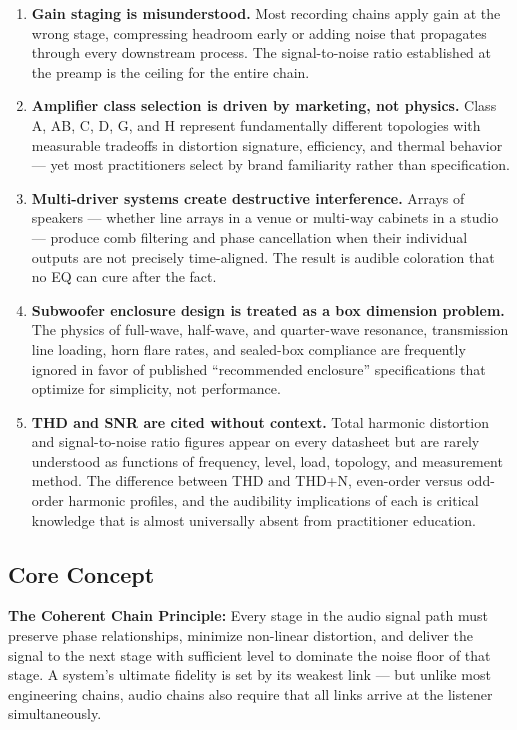 \documentclass[11pt,letterpaper]{article}
\begin{document}
\begin{enumerate}
  \item \textbf{Gain staging is misunderstood.} Most recording chains apply gain at the wrong stage, compressing headroom early or adding noise that propagates through every downstream process. The signal-to-noise ratio established at the preamp is the ceiling for the entire chain.
  \item \textbf{Amplifier class selection is driven by marketing, not physics.} Class A, AB, C, D, G, and H represent fundamentally different topologies with measurable tradeoffs in distortion signature, efficiency, and thermal behavior --- yet most practitioners select by brand familiarity rather than specification.
  \item \textbf{Multi-driver systems create destructive interference.} Arrays of speakers --- whether line arrays in a venue or multi-way cabinets in a studio --- produce comb filtering and phase cancellation when their individual outputs are not precisely time-aligned. The result is audible coloration that no EQ can cure after the fact.
  \item \textbf{Subwoofer enclosure design is treated as a box dimension problem.} The physics of full-wave, half-wave, and quarter-wave resonance, transmission line loading, horn flare rates, and sealed-box compliance are frequently ignored in favor of published ``recommended enclosure'' specifications that optimize for simplicity, not performance.
  \item \textbf{THD and SNR are cited without context.} Total harmonic distortion and signal-to-noise ratio figures appear on every datasheet but are rarely understood as functions of frequency, level, load, topology, and measurement method. The difference between THD and THD+N, even-order versus odd-order harmonic profiles, and the audibility implications of each is critical knowledge that is almost universally absent from practitioner education.
\end{enumerate}

\subsection{Core Concept}

\textbf{The Coherent Chain Principle:} Every stage in the audio signal path must preserve phase relationships, minimize non-linear distortion, and deliver the signal to the next stage with sufficient level to dominate the noise floor of that stage. A system's ultimate fidelity is set by its weakest link --- but unlike most engineering chains, audio chains also require that all links arrive at the listener simultaneously.
\end{document}
